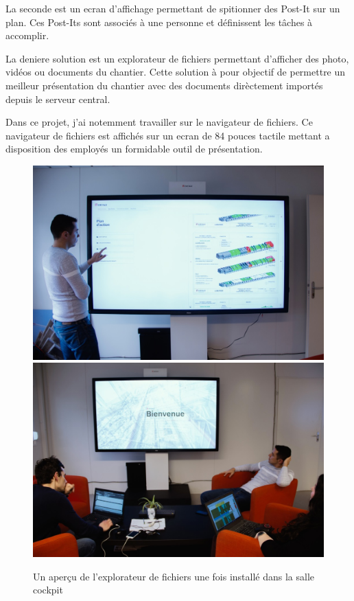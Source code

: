 La seconde est un ecran d'affichage permettant de spitionner des Post-It sur un plan.
Ces Post-Its sont associés à une personne et définissent les tâches à accomplir.

La deniere solution est un explorateur de fichiers permettant d'afficher des photo, vidéos ou documents du chantier.
Cette solution à pour objectif de permettre un meilleur présentation du chantier avec des documents dirèctement importés depuis le serveur central.

\medskip

Dans ce projet, j'ai notemment travailler sur le navigateur de fichiers.
Ce navigateur de fichiers est affichés sur un ecran de 84 pouces tactile mettant a disposition des employés un formidable outil de présentation.

\begin{figure}[h]
    \centering
    \includegraphics[scale=0.215]{img/media-reader-pres-1.jpg}
    \includegraphics[scale=0.19]{img/media-reader-pres-2.jpg}
    \caption{Un aperçu de l'explorateur de fichiers une fois installé dans la salle cockpit}
\end{figure}

